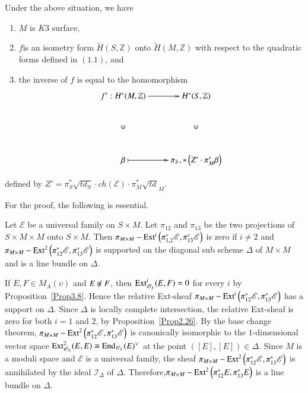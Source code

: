 \setcounter{dfn}{8}
\begin{Theorem}\label{Theorem4.9}
Under the above situation, we have 
\begin{enumerate}
\renewcommand{\labelenumi}{(\theenumi)}
\item $M$ is $K3$ surface, 

\item $f$\pageoriginale is an isometry form $\widetilde{H}(S,\mathbb{Z})$ onto
$\widetilde{H}(M,\mathbb{Z})$ with respect to the quadratic forms
defined in $(1.1)$, and 

\item the inverse of $f$ is equal to the homomorphism 
$$
\xymatrix{f':H^{\ast}(M,\mathbb{Z})\ar[r]&H^{\ast}(S,\mathbb{Z})\\
\mbox{\rotatebox{90}{$\in$}}&\mbox{\rotatebox{90}{$\in$}}\\
\beta\ar@{|->}[r]&\pi_S,\ast\left(Z'\cdot \pi^{\ast}_M\beta\right)}
$$
\end{enumerate}
defined by $Z'=\pi_S^{\ast}\sqrt{td_S}\cdot
ch(\mathscr{E})\cdot \pi_{M}^{\ast}\sqrt{td}_M$. 
\end{Theorem}

For the proof, the following is essential.

\begin{Prop}\label{Prop4.10}
Let $\mathscr{E}$ be a universal family on $S\times M$. Let $\pi_{12}$
and $\pi_{13}$ be the two projections of $S\times M\times M$ onto
$S\times M$. Then $\pi_{M\times
M}-\mathrm{Ext}^{i}\left(\pi_{1,2}^{\ast}\mathscr{E},\pi^{\ast}_{13}\mathscr{E}\right)$
is zero if $i\neq 2$ and $\pi_{M\times
M}-\mathrm{Ext}^{2}\left(\pi_{12}^{\ast}\mathscr{E},\pi^{\ast}_{13}\mathscr{E}\right)$ is supported on
the diagonal sub scheme  $\Delta$ of $M\times M$ and is a line bundle
on $\Delta$.
\end{Prop}

\begin{Proof}
If $E,F\in M_A(\upsilon)$ and $E\not\kern-1pt\cong F$, then
$\mathrm{Ext}^{i}_{\mathscr{O}_S}(E,F)=0$ for every $i$ by
Proposition~\ref{Prop3.8}. Hence the relative Ext-sheaf $\pi_{M\times
M}-\mathrm{Ext}^{i}\left(\pi_{12}^{\ast}\mathscr{E},\pi^{\ast}_{1
3}\mathscr{E}\right)$ has a support on $\Delta$. Since $\Delta$ is
locally complete intersection, the relative Ext-sheaf is zero for both
$i=1$ and $2$, by Proposition~\ref{Prop2.26}. By the base change
theorem, $\pi_{M\times M}-\mathrm{Ext}^{2}\left(\pi^{\ast}_{1
2}\mathscr{E},\pi^{\ast}_{1 3}\mathscr{E}\right)$ is canonically
isomorphic to the $1$-dimensional vector space
$\mathrm{Ext}^{2}_{\mathscr{O}_S}(E,E)\cong \mathrm{End}_{\mathscr{O}_S}(E)^{\vee}$
at the point $([E], [E])\in \Delta$. Since $M$ is a moduli space and
$\mathscr{E}$ is a universal family, the sheaf $\pi_{M\times
M}-\mathrm{Ext}^{2}\left(\pi^{\ast}_{1 2}\mathscr{E},\pi^{\ast}_{1
3}\mathscr{E}\right)$ is annihilated by the ideal
$\mathscr{I}_{\Delta}$ of $\Delta$. Therefore,\pageoriginale $\pi_{M\times
M}-\mathrm{Ext}^{2}\left(\pi^{*}_{1 2}E,\pi^{\ast}_{1 3} E\right)$ is a line
bundle on $\Delta$. 
\enprf
\end{Proof}

